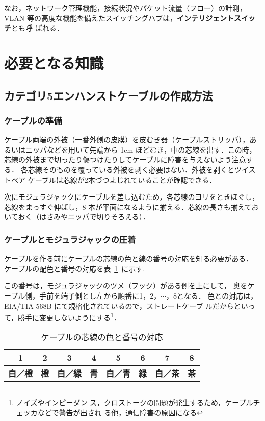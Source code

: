 なお，ネットワーク管理機能，接続状況やパケット流量（フロー）の計測，VLAN
等の高度な機能を備えたスイッチングハブは，\textbf{インテリジェントスイッチ}とも呼
ばれる．

\section{必要となる知識}
\subsection*{カテゴリ5エンハンストケーブルの作成方法}
\subsubsection{ケーブルの準備}
ケーブル両端の外被（一番外側の皮膜）を皮むき器（ケーブルストリッパ），あ
るいはニッパなどを用いて先端から 1cm ほどむき，中の芯線を出す．この時，
芯線の外被まで切ったり傷つけたりしてケーブルに障害を与えないよう注意する．
各芯線そのものを覆っている外被を剥く必要はない．外被を剥くとツイストペア
ケーブルは芯線が2本づつよじれていることが確認できる．

次にモジュラジャックにケーブルを差し込むため，各芯線のヨリをときほぐし，
芯線をまっすぐ伸ばし，8 本が平面になるように揃える．芯線の長さも揃えてお
いておく（はさみやニッパで切りそろえる）．

\subsubsection{ケーブルとモジュラジャックの圧着}
ケーブルを作る前にケーブルの芯線の色と線の番号の対応を知る必要がある．
ケーブルの配色と番号の対応を表~\ref{tab:02:cable}~に示す.

この番号は，モジュラジャックのツメ（フック）がある側を上にして，
奥をケーブル側，手前を端子側とし左から順番に1，2，$\cdots$，8となる．
色との対応は，EIA/TIA 568B にて規格化されているので，ストレートケーブ
ルだからといって，勝手に変更しないようにする\footnote{ノイズやインピーダン
ス，クロストークの問題が発生するため，ケーブルチェッカなどで警告が出され
る他，通信障害の原因になる}．

\begin{table}
\begin{center}
\caption{ケーブルの芯線の色と番号の対応}
\label{tab:02:cable}
\vspace*{1zh}
\begin{tabular}%
{|p{1.2cm}|p{1.2cm}|p{1.2cm}|p{1.2cm}|p{1.2cm}|p{1.2cm}|p{1.2cm}|p{1.2cm}|}\hline
\multicolumn{1}{|c}{1}&%
\multicolumn{1}{|c}{2}&%
\multicolumn{1}{|c}{3}&%
\multicolumn{1}{|c}{4}&%
\multicolumn{1}{|c}{5}&%
\multicolumn{1}{|c}{6}&%
\multicolumn{1}{|c}{7}&%
\multicolumn{1}{|c|}{8}\\\hline\hline
\multicolumn{1}{|c}{\bf 白／橙}&%
\multicolumn{1}{|c}{\bf 橙}&%
\multicolumn{1}{|c}{\bf 白／緑}&%
\multicolumn{1}{|c}{\bf 青}&%
\multicolumn{1}{|c}{\bf 白／青}&%
\multicolumn{1}{|c}{\bf 緑}&%
\multicolumn{1}{|c}{\bf 白／茶}&%
\multicolumn{1}{|c|}{\bf 茶}\\
\hline
\end{tabular}
\end{center}
\end{table}


